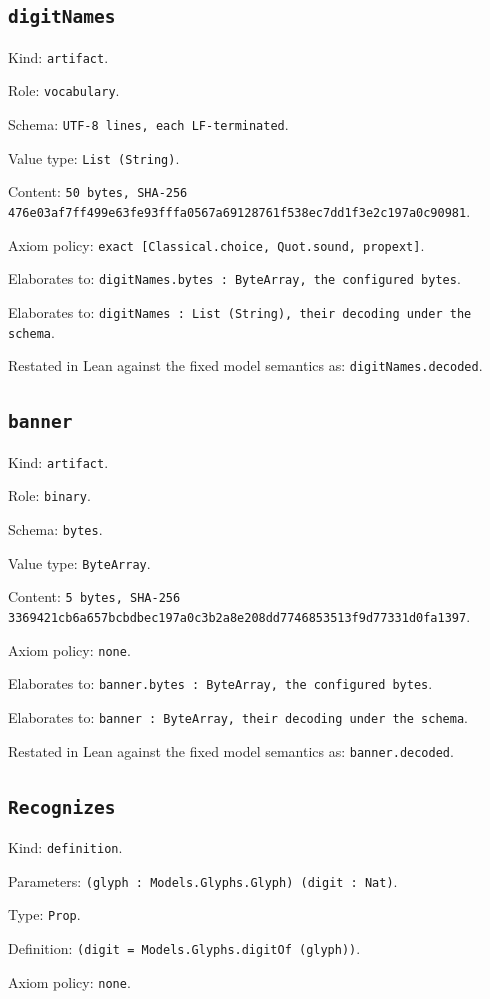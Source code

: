 \documentclass[11pt]{article}
\begin{document}
\subsection*{\texttt{digitNames}}
\noindent Kind: \texttt{artifact}.\par
\noindent Role: \texttt{vocabulary}.\par
\noindent Schema: \texttt{UTF-8 lines, each LF-terminated}.\par
\noindent Value type: \texttt{List (String)}.\par
\noindent Content: \texttt{50 bytes, SHA-256 476e03af7ff499e63fe93fffa0567a69128761f538ec7dd1f3e2c197a0c90981}.\par
\noindent Axiom policy: \texttt{exact [Classical.choice, Quot.sound, propext]}.\par
\noindent Elaborates to: \texttt{digitNames.bytes : ByteArray, the configured bytes}.\par
\noindent Elaborates to: \texttt{digitNames : List (String), their decoding under the schema}.\par
\noindent Restated in Lean against the fixed model semantics as: \texttt{digitNames.decoded}.\par
\subsection*{\texttt{banner}}
\noindent Kind: \texttt{artifact}.\par
\noindent Role: \texttt{binary}.\par
\noindent Schema: \texttt{bytes}.\par
\noindent Value type: \texttt{ByteArray}.\par
\noindent Content: \texttt{5 bytes, SHA-256 3369421cb6a657bcbdbec197a0c3b2a8e208dd7746853513f9d77331d0fa1397}.\par
\noindent Axiom policy: \texttt{none}.\par
\noindent Elaborates to: \texttt{banner.bytes : ByteArray, the configured bytes}.\par
\noindent Elaborates to: \texttt{banner : ByteArray, their decoding under the schema}.\par
\noindent Restated in Lean against the fixed model semantics as: \texttt{banner.decoded}.\par
\subsection*{\texttt{Recognizes}}
\noindent Kind: \texttt{definition}.\par
\noindent Parameters: \texttt{(glyph : Models.Glyphs.Glyph) (digit : Nat)}.\par
\noindent Type: \texttt{Prop}.\par
\noindent Definition: \texttt{(digit = Models.Glyphs.digitOf (glyph))}.\par
\noindent Axiom policy: \texttt{none}.\par
\end{document}

